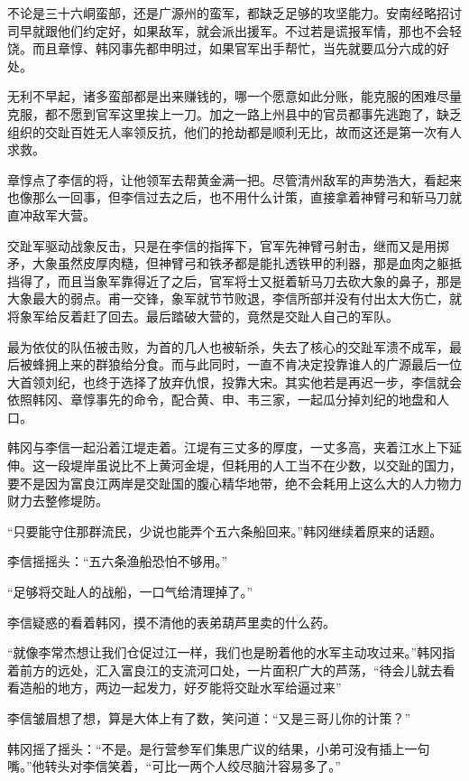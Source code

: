 不论是三十六峒蛮部，还是广源州的蛮军，都缺乏足够的攻坚能力。安南经略招讨司早就跟他们约定好，如果敌军，就会派出援军。不过若是谎报军情，那也不会轻饶。而且章惇、韩冈事先都申明过，如果官军出手帮忙，当先就要瓜分六成的好处。

无利不早起，诸多蛮部都是出来赚钱的，哪一个愿意如此分账，能克服的困难尽量克服，都不愿到官军这里挨上一刀。加之一路上州县中的官员都事先逃跑了，缺乏组织的交趾百姓无人率领反抗，他们的抢劫都是顺利无比，故而这还是第一次有人求救。

章惇点了李信的将，让他领军去帮黄金满一把。尽管清州敌军的声势浩大，看起来也像那么一回事，但李信过去之后，也不用什么计策，直接拿着神臂弓和斩马刀就直冲敌军大营。

交趾军驱动战象反击，只是在李信的指挥下，官军先神臂弓射击，继而又是用掷矛，大象虽然皮厚肉糙，但神臂弓和铁矛都是能扎透铁甲的利器，那是血肉之躯抵挡得了，而且当象军靠得近了之后，官军将士又挺着斩马刀去砍大象的鼻子，那是大象最大的弱点。甫一交锋，象军就节节败退，李信所部并没有付出太大伤亡，就将象军给反着赶了回去。最后踏破大营的，竟然是交趾人自己的军队。

最为依仗的队伍被击败，为首的几人也被斩杀，失去了核心的交趾军溃不成军，最后被蜂拥上来的群狼给分食。而与此同时，一直不肯决定投靠谁人的广源最后一位大首领刘纪，也终于选择了放弃仇恨，投靠大宋。其实他若是再迟一步，李信就会依照韩冈、章惇事先的命令，配合黄、申、韦三家，一起瓜分掉刘纪的地盘和人口。

韩冈与李信一起沿着江堤走着。江堤有三丈多的厚度，一丈多高，夹着江水上下延伸。这一段堤岸虽说比不上黄河金堤，但耗用的人工当不在少数，以交趾的国力，要不是因为富良江两岸是交趾国的腹心精华地带，绝不会耗用上这么大的人力物力财力去整修堤防。

“只要能守住那群流民，少说也能弄个五六条船回来。”韩冈继续着原来的话题。

李信摇摇头：“五六条渔船恐怕不够用。”

“足够将交趾人的战船，一口气给清理掉了。”

李信疑惑的看着韩冈，摸不清他的表弟葫芦里卖的什么药。

“就像李常杰想让我们仓促过江一样，我们也是盼着他的水军主动攻过来。”韩冈指着前方的远处，汇入富良江的支流河口处，一片面积广大的芦荡，“待会儿就去看看造船的地方，两边一起发力，好歹能将交趾水军给逼过来”

李信皱眉想了想，算是大体上有了数，笑问道：“又是三哥儿你的计策？”

韩冈摇了摇头：“不是。是行营参军们集思广议的结果，小弟可没有插上一句嘴。”他转头对李信笑着，“可比一两个人绞尽脑汁容易多了。”


